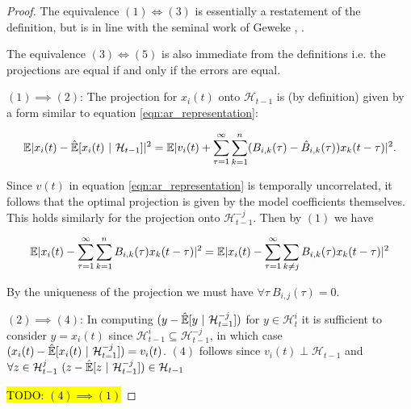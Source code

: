 \documentclass[12pt]{article}
\def\H{\mathcal{H}}  %
\newcommand{\linE}[2]{\hat{\E}[#1\ |\ #2]}  %
\begin{document}
\begin{proof}
  The equivalence $(1) \iff (3)$ is essentially a restatement of the
  definition, but is in line with the seminal work of Geweke
  \cite{geweke1982measurement}, \cite{geweke1984}.

  The equivalence $(3) \iff (5)$ is also immediate from the
  definitions i.e. the projections are equal if and only if the errors
  are equal.

  $(1) \implies (2)$: The projection for $x_i(t)$ onto $\H_{t - 1}$ is
  (by definition) given by a form similar to equation
  \ref{eqn:ar_representation}:

\[
  \E|x_i(t) - \linE{x_i(t)}{\H_{t - 1}}|^2 = \E|v_i(t) + \sum_{\tau = 1}^\infty \sum_{k = 1}^n (B_{i, k}(\tau) - \hat{B}_{i, k}(\tau))x_k(t - \tau)|^2.
\]

Since $v(t)$ in equation \ref{eqn:ar_representation} is temporally
uncorrelated, it follows that the optimal projection is given by the
model coefficients themselves.  This holds similarly for the
projection onto $\H_{t - 1}^{-j}$.  Then by $(1)$ we have

\[
  \mathbb{E}|x_i(t) - \sum_{\tau = 1}^\infty \sum_{k = 1}^n B_{i, k}(\tau)x_k(t - \tau)|^2 = \mathbb{E}|x_i(t) - \sum_{\tau = 1}^\infty\sum_{k \ne j}B_{i, k}(\tau)x_k(t - \tau)|^2
\]

By the uniqueness of the projection we must have
$\forall \tau\ B_{i, j}(\tau) = 0$.

$(2) \implies (4)$: In computing $(y - \linE{y}{\H_{t = 1}^{-j}})$ for
$y \in \H_t^i$ it is sufficient to consider $y = x_i(t)$ since
$\H_{t - 1}^i \subseteq \H_{t - 1}^{-j}$, in which case
$(x_i(t) - \linE{x_i(t)}{\H_{t = 1}^{-j}}) = v_i(t)$.  $(4)$ follows
since $v_i(t) \perp \H_{t - 1}$ and
$\forall z \in \H_{t - 1}^j\ (z - \linE{z}{\H_{t - 1}^{-j}}) \in \H_{t
  - 1}$

\hl{TODO: $(4) \implies (1)$}
  
\end{proof}



\end{document}
